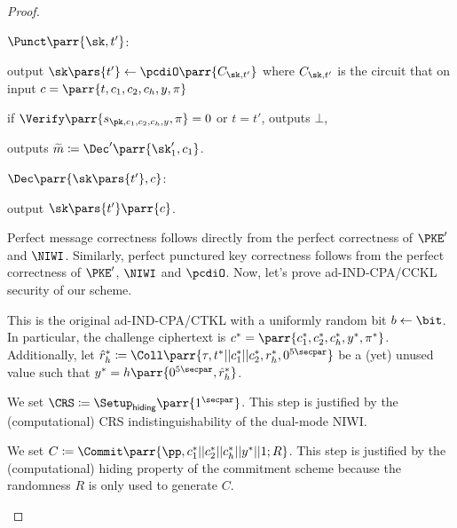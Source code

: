 \begin{proof}
\begin{sitemize}
        \item \(\Punct\parr{\sk,t'}\):
        \begin{sitemize}
            \item output \(\sk\pars{t'} \gets \pcdiO\parr{C_{\sk,t'}}\) where \(C_{\sk,t'}\) is the circuit that on input \(c = \parr{t,c_1,c_2,c_h,y,\pi}\)
            \begin{sitemize}
                \item if \(\Verify\parr{s_{\pk,c_1,c_2,c_h,y},\pi} = 0\) or \(t=t'\), outputs \(\bot\),
                \item outputs \(\widetilde{m} \coloneqq \Dec'\parr{\sk'_1,c_1}\).
            \end{sitemize}
        \end{sitemize}

        \item \(\Dec\parr{\sk\pars{t'},c}\):
        \begin{sitemize}
            \item output \(\sk\pars{t'}\parr{c}\).
        \end{sitemize}
    \end{sitemize}
    Perfect message correctness follows directly from the perfect correctness of \(\PKE'\) and \(\NIWI\).
    Similarly, perfect punctured key correctness follows from the perfect correctness of \(\PKE'\), \(\NIWI\) and \(\pcdiO\).
    Now, let's prove ad-IND-CPA/CCKL security of our scheme.
    \begin{hybrids}
        \item This is the original ad-IND-CPA/CTKL with a uniformly random bit \(b \gets \bit\).
        In particular, the challenge ciphertext is \(c^* = \parr{c^*_1,c^*_2,c^*_h,y^*,\pi^*}\).
        Additionally, let \(\hat{r}^*_h \coloneqq \Coll\parr{\tau,t^*||c^*_1||c^*_2,r^*_h,0^{5\secpar}}\) be a (yet) unused value such that \(y^* = h\parr{0^{5\secpar},\hat{r}^*_h}\).

        \item We set \(\CRS \coloneqq \Setup_{\textsf{hiding}}\parr{1^\secpar}\).
        This step is justified by the (computational) CRS indistinguishability of the dual-mode NIWI.

        \item We set \(C \coloneqq \Commit\parr{\pp,c^*_1||c^*_2||c^*_h||y^*||1;R}\).
        This step is justified by the (computational) hiding property of the commitment scheme because the randomness \(R\) is only used to generate \(C\).


\end{hybrids}
\end{proof}
